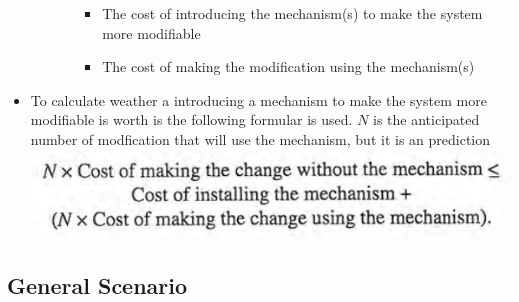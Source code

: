 \documentclass[11pt]{article}
\makeatletter
\def\maxwidth{\ifdim\Gin@nat@width>\linewidth\linewidth
    \else\Gin@nat@width\fi}
\let\Oldincludegraphics\includegraphics
\renewcommand{\includegraphics}[1]{\Oldincludegraphics[width=.8\maxwidth]{#1}}
\providecommand{\tightlist}{%
      \setlength{\itemsep}{0pt}\setlength{\parskip}{0pt}}
\makeatother
\begin{document}
\begin{itemize}
\begin{enumerate}
\begin{itemize}
      \begin{itemize}
      \tightlist
      \item
        The cost of introducing the mechanism(s) to make the system more
        modifiable
      \item
        The cost of making the modification using the mechanism(s)
      \end{itemize}
    \end{itemize}
  \end{enumerate}
\item
  To calculate weather a introducing a mechanism to make the system more
  modifiable is worth is the following formular is used. \(N\) is the
  anticipated number of modfication that will use the mechanism, but it
  is an prediction \includegraphics{img/modification_formular.png}
\end{itemize}

    \hypertarget{general-scenario}{%
\subsection{General Scenario}\label{general-scenario}}
\end{document}

